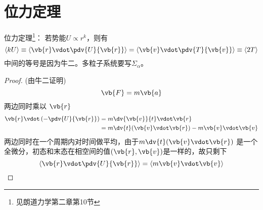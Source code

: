 
\section{位力定理}

位力定理\footnote{见朗道力学第二章第10节}：
若势能\(U \propto r^k\)，则有
\begin{equation}
  \Braket{kU} \equiv \Braket{\vb{r} \vdot \pdv{U}{\vb{r}}} =
  \Braket{ \vb{v} \vdot \pdv{T}{\vb{v}}} \equiv  \Braket{2T}
\end{equation}
中间的等号是因为牛二。多粒子系统要写\(\Sigma_\alpha\)。
\begin{proof} (由牛二证明)
  \begin{equation}
    \vb{F} = m \vb{a}
  \end{equation}
  两边同时乘以 \(\vb{r}\)
  \begin{equation}
    \begin{aligned}
      \vb{r} \vdot \left( - \pdv{U}{\vb{r}} \right) &= m \dv{\vb{v}}{t} \vdot \vb{r} \\
                                                    &=
m \dv{t}(\vb{v} \vdot \vb{r})
- m \vb{v} \vdot \vb{v}
    \end{aligned}
  \end{equation}
    两边同时在一个周期内对时间做平均，由于$ m \dv{t}(\vb{v} \vdot \vb{r})$ 是一个全微分，初态和末态在相空间的值$(\vb{r}, \vb{v})$是一样的，故只剩下
  \begin{equation}
    \Braket{\vb{r} \vdot \pdv{U}{\vb{r}} } =
\Braket{m \vb{v} \vdot \vb{v}}
  \end{equation}
\end{proof}




